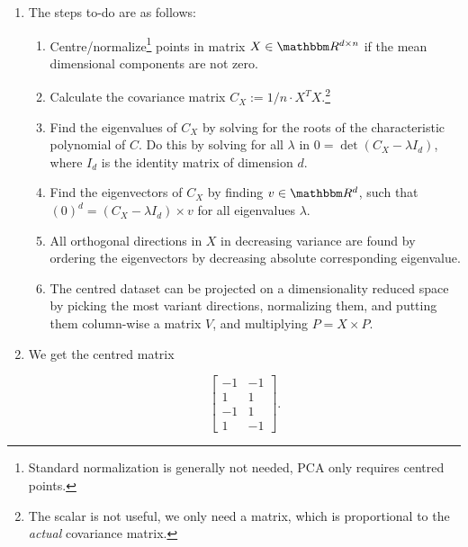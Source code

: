 
\renewcommand{\ex}{7}
\setcounter{section}{\ex}


    \maketitle
    
    \begin{exercise}[Warmup] \hfill
        \begin{enumerate}
            \item[a)] The steps to-do are as follows:
            \begin{enumerate}
                \item[1.] Centre/normalize\footnote{Standard normalization is generally not needed, PCA only requires centred points.} points in matrix \(X \in \R^{d \times n}\) if the mean dimensional components are not zero.
                \item[2.] Calculate the covariance matrix \(C_X := 1/n \cdot X^TX\).\footnote{The scalar is not useful, we only need a matrix, which is proportional to the \emph{actual} covariance matrix.}
                \item[3.] Find the eigenvalues of \(C_X\) by solving for the roots of the characteristic polynomial of \(C\).
                Do this by solving for all \(\lambda\) in \(0 = \det(C_X - \lambda I_d)\), where \(I_d\) is the identity matrix of dimension \(d\).
                \item[4.] Find the eigenvectors of \(C_X\) by finding \(v \in \R^d\), such that \((0)^d = (C_X - \lambda I_d) \times v\) for all eigenvalues \(\lambda\).
                \item[5.] All orthogonal directions in \(X\) in decreasing variance are found by ordering the eigenvectors by decreasing absolute corresponding eigenvalue.
                \item[6.] The centred dataset can be projected on a dimensionality reduced space by picking the most variant directions, normalizing them, and putting them column-wise a matrix \(V\), and multiplying \(P = X \times P\).
            \end{enumerate}

            \item[b)]
            We get the centred matrix
            
            \[\begin{bmatrix}
                -1 & -1 \\
                1 & 1 \\
                -1 & 1 \\
                1 & -1
            \end{bmatrix}.\]


\end{enumerate}
\end{exercise}
